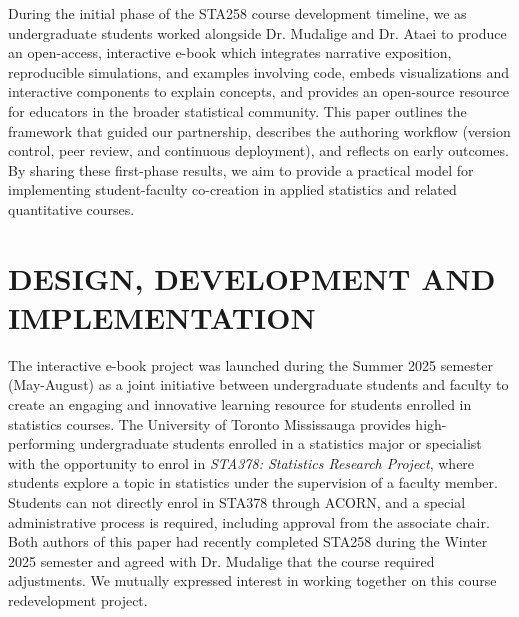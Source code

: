 \documentclass[11pt]{article}
\begin{document}
During the initial phase of the STA258 course development timeline, we as undergraduate students worked alongside Dr. Mudalige and Dr. Ataei to produce an open-access, interactive e-book which integrates narrative exposition, reproducible simulations, and examples involving code, embeds visualizations and interactive components to explain concepts, and provides an open-source resource for educators in the broader statistical community.
This paper outlines the framework that guided our partnership, describes the authoring workflow (version control, peer review, and continuous deployment), and reflects on early outcomes. By sharing these first-phase results, we aim to provide a practical model for implementing student-faculty co-creation in applied statistics and related quantitative courses.

%
%


\section{DESIGN, DEVELOPMENT AND IMPLEMENTATION}
\label{sec:design}

The interactive e-book project was launched during the Summer 2025 semester (May-August) as a joint initiative between undergraduate students and faculty to create an engaging and innovative learning resource for students enrolled in statistics courses. 
The University of Toronto Mississauga provides high-performing undergraduate students enrolled in a statistics major or specialist with the opportunity to enrol in \textit{STA378: Statistics Research Project}, where students explore a topic in statistics under the supervision of a faculty member.
Students can not directly enrol in STA378 through ACORN, and a special administrative process is required, including approval from the associate chair.
Both authors of this paper had recently completed STA258 during the Winter 2025 semester and agreed with Dr. Mudalige that the course required adjustments. We mutually expressed interest in working together on this course redevelopment project.
\end{document}
